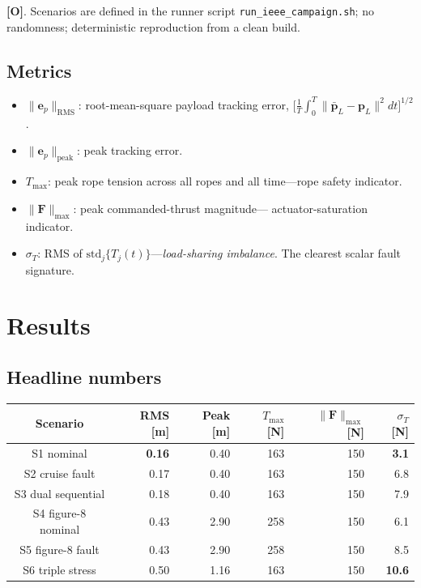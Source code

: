 \documentclass[11pt,a4paper,oneside]{report}
\newcommand{\bp}{\bm{p}}
\newcommand{\bF}{\bm{F}}
\newcommand{\be}{\bm{e}}
\newcommand{\Obs}{\textcolor{green!50!black}{\textbf{[O]}}}
\begin{document}
\Obs. Scenarios are defined in the runner script
\texttt{run\_ieee\_campaign.sh}; no randomness; deterministic
reproduction from a clean build.

\section{Metrics}

\begin{itemize}
\item $\|\be_p\|_\text{RMS}$: root-mean-square payload tracking error,
$\big[\frac{1}{T}\!\int_0^T \|\bar{\bp}_L-\bp_L\|^2 dt\big]^{1/2}$.
\item $\|\be_p\|_\text{peak}$: peak tracking error.
\item $T_\text{max}$: peak rope tension across all ropes and all
time---rope safety indicator.
\item $\|\bF\|_\text{max}$: peak commanded-thrust magnitude---
actuator-saturation indicator.
\item $\sigma_T$: RMS of $\mathrm{std}_j\{T_j(t)\}$---\emph{load-sharing
imbalance}. The clearest scalar fault signature.
\end{itemize}

\chapter{Results}
\label{chap:results}

\section{Headline numbers}

\begin{longtable}{>{\ttfamily}c r r r r r}
\toprule
\textbf{Scenario} & RMS [m] & Peak [m] & $T_\text{max}$ [N]
& $\|\bF\|_\text{max}$ [N] & $\sigma_T$ [N] \\
\midrule
S1 nominal          & \textbf{0.16} & 0.40 & 163 & 150 & \textbf{3.1} \\
S2 cruise fault     & 0.17          & 0.40 & 163 & 150 & 6.8 \\
S3 dual sequential  & 0.18          & 0.40 & 163 & 150 & 7.9 \\
S4 figure-8 nominal & 0.43          & 2.90 & 258 & 150 & 6.1 \\
S5 figure-8 fault   & 0.43          & 2.90 & 258 & 150 & 8.5 \\
S6 triple stress    & 0.50          & 1.16 & 163 & 150 & \textbf{10.6}\\
\bottomrule
\end{longtable}
\end{document}
